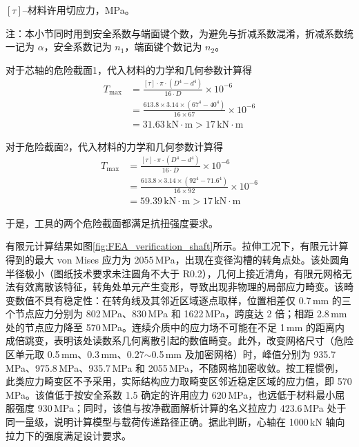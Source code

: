 $[\tau]$--材料许用切应力，MPa。

注：本小节同时用到安全系数与端面键个数，为避免与折减系数混淆，折减系数统一记为 $\alpha$，安全系数记为 $n_1$，端面键个数记为 $n_2$。

对于芯轴的危险截面1，代入材料的力学和几何参数计算得
\begin{equation}
    \begin{aligned}
        T_{\max} &= \frac{[\tau] \cdot \pi \cdot (D^4 - d^4)}{16 \cdot D} \times 10^{-6}  \\
        &= \frac{613.8 \times 3.14 \times (67^4 - 40^4)}{16 \times 67} \times 10^{-6}  \\
        &= 31.63\,\text{kN} \cdot \text{m} > 17\,\text{kN} \cdot \text{m}
    \end{aligned}
\end{equation}

对于危险截面2，代入材料的力学和几何参数计算得
\begin{equation}
    \begin{aligned}
        T_{\max} &= \frac{[\tau] \cdot \pi \cdot (D^4 - d^4)}{16 \cdot D} \times 10^{-6}  \\
        &= \frac{613.8 \times 3.14 \times (92^4 - 71.6^4)}{16 \times 92} \times 10^{-6}  \\
        &= 59.39\,\text{kN} \cdot \text{m} > 17\,\text{kN} \cdot \text{m}
    \end{aligned}
\end{equation}

于是，工具的两个危险截面都满足抗扭强度要求。

有限元计算结果如图\ref{fig:FEA_verification_shaft}所示。拉伸工况下，有限元计算得到的最大 von Mises 应力为 2055\,MPa，出现在变径沟槽的转角点处。该处圆角半径极小（图纸技术要求未注圆角不大于 R0.2），几何上接近清角，有限元网格无法有效离散该特征，转角处单元产生变形，导致出现非物理的局部应力畸变。该畸变数值不具有稳定性：在转角线及其邻近区域逐点取样，位置相差仅 0.7\,mm 的三个节点应力分别为 802\,MPa、830\,MPa 和 1622\,MPa，跨度达 2 倍；相距 2.8\,mm 处的节点应力降至 570\,MPa。连续介质中的应力场不可能在不足 1\,mm 的距离内成倍跳变，表明该处读数系几何离散引起的数值畸变。此外，改变网格尺寸（危险区单元取 0.5\,mm、0.3\,mm、0.27$\sim$0.5\,mm 及加密网格）时，峰值分别为 935.7\,MPa、975.8\,MPa、935.7\,MPa 和 2055\,MPa，不随网格加密收敛。按工程惯例，此类应力畸变区不予采用，实际结构应力取畸变区邻近稳定区域的应力值，即 570\,MPa。该值低于按安全系数 1.5 确定的许用应力 620\,MPa，也远低于材料最小屈服强度 930\,MPa；同时，该值与按净截面解析计算的名义拉应力 423.6\,MPa 处于同一量级，说明计算模型与载荷传递路径正确。据此判断，心轴在 1000\,kN 轴向拉力下的强度满足设计要求。

